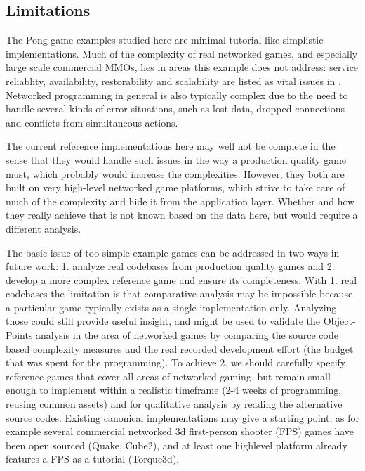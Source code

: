 \documentclass[conference]{IEEEtran}
\begin{document}
\subsection{Limitations%
  \label{limitations}%
}

The Pong game examples studied here are minimal tutorial like
simplistic implementations. Much of the complexity of real networked
games, and especially large scale commercial MMOs, lies in areas this
example does not address: service reliablity, availability,
restorability and scalability are listed as vital issues in
\cite{middleware}. Networked programming in general is also typically
complex due to the need to handle several kinds of error situations,
such as lost data, dropped connections and conflicts from simultaneous
actions.

The current reference implementations here may well not be complete in
the sense that they would handle such issues in the way a production
quality game must, which probably would increase the
complexities. However, they both are built on very high-level
networked game platforms, which strive to take care of much of the
complexity and hide it from the application layer. Whether and how
they really achieve that is not known based on the data here, but
would require a different analysis.

The basic issue of too simple example games can be addressed in two
ways in future work: 1. analyze real codebases from production quality
games and 2. develop a more complex reference game and ensure its
completeness. With 1. real codebases the limitation is that
comparative analysis may be impossible because a particular game
typically exists as a single implementation only. Analyzing those
could still provide useful insight, and might be used to validate the
Object-Points analysis in the area of networked games by comparing the
source code based complexity measures and the real recorded
development effort (the budget that was spent for the programming). To
achieve 2. we should carefully specify reference games that cover all
areas of networked gaming, but remain small enough to implement within
a realistic timeframe (2-4 weeks of programming, reusing common
assets) and for qualitative analysis by reading the alternative source
codes. Existing canonical implementations may give a starting point,
as for example several commercial networked 3d first-person shooter
(FPS) games have been open sourced (Quake, Cube2), and at least one
highlevel platform already features a FPS as a tutorial (Torque3d).
\end{document}
